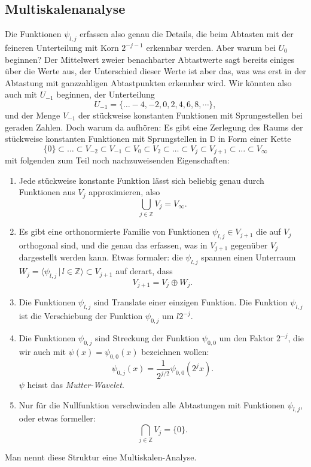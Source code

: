 \subsection{Multiskalenanalyse}
Die Funktionen $\psi_{l,j}$ erfassen also genau die Details, die beim
Abtasten mit der feineren Unterteilung mit Korn $2^{-j-1}$ erkennbar
werden.
Aber warum bei $U_0$ beginnen?
Der Mittelwert zweier benachbarter Abtastwerte sagt bereits einiges
über die Werte aus, der Unterschied dieser Werte ist aber das, was
was erst in der Abtastung mit ganzzahligen Abtastpunkten erkennbar wird.
Wir könnten also auch mit $U_{-1}$ beginnen, der Unterteilung
\[
U_{-1} = \{\dots -4,-2,0,2,4,6,8,\cdots\},
\]
und der Menge $V_{-1}$ der stückweise konstanten Funktionen mit
Sprungestellen bei geraden Zahlen.
Doch warum da aufhören: Es gibt eine Zerlegung des Raums der stückweise
konstanten Funktionen mit Sprungstellen in $\mathbb D$ in Form einer
Kette
\begin{equation}
\{0\}
\subset
\dots
\subset
V_{-2}\subset V_{-1} \subset V_{0} \subset V_{2} \subset\dots\subset
V_j \subset V_{j+1}\subset\dots \subset V_{\infty}
\label{haar:kette}
\end{equation}
mit folgenden zum Teil noch nachzuweisenden Eigenschaften:
\begin{enumerate}
\item
Jede stückweise konstante Funktion lässt sich beliebig genau
durch Funktionen aus $V_j$ approximieren, also
\[
\bigcup_{j\in\mathbb Z} V_j = V_\infty.
\]
\item
Es gibt eine orthonormierte Familie von Funktionen $\psi_{l,j}\in V_{j+1}$
die auf $V_j$ orthogonal sind, und die genau das erfassen, was in $V_{j+1}$
gegenüber $V_j$ dargestellt werden kann.
Etwas formaler: die $\psi_{l,j}$ spannen einen Unterraum
$W_{j} = \langle \psi_{l,j}\,|\, l\in\mathbb Z\rangle \subset V_{j+1}$
auf derart, dass
\[
V_{j+1} = V_j \oplus W_j.
\]
\item 
Die Funktionen $\psi_{l,j}$ sind Translate einer einzigen Funktion.
Die Funktion $\psi_{l,j}$ ist die Verschiebung der Funktion $\psi_{0,j}$ 
um $l2^{-j}$.
\item
Die Funktionen $\psi_{0,j}$ sind Streckung der Funktion
$\psi_{0,0}$ um den Faktor $2^{-j}$, die wir auch mit
$\psi(x)=\psi_{0,0}(x)$ bezeichnen wollen:
\[
\psi_{0,j}(x) = \frac1{2^{j/2}}\psi_{0,0}(2^jx).
\]
$\psi$ heisst das {\em Mutter-Wavelet}.
\item 
Nur für die Nullfunktion verschwinden alle Abtastungen mit Funktionen
$\psi_{l,j}$, oder etwas formeller:
\[
\bigcap_{j\in\mathbb Z} V_j
=
\{0\}.
\]
\end{enumerate}
Man nennt diese Struktur eine Multiskalen-Analyse.


